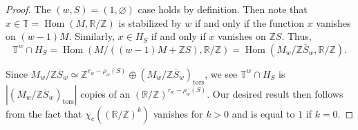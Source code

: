 \documentclass[12pt,a4paper]{amsart}
\theoremstyle{definition}
\newcommand{\TT}{\mathbb T}
\newcommand{\ZZ}{\mathbb{Z}}
\newcommand{\RR}{\mathbb{R}}
\renewcommand{\1}{\textbf{1}}
\newcommand{\<}{\langle}
\renewcommand{\>}{\rangle}
\DeclareMathOperator{\Hom}{Hom}
\DeclareMathOperator{\tors}{tors}
\begin{document}
\begin{proof}
The $(w,S)=(1,\varnothing)$ case holds by definition. Then note that $x\in\TT=\Hom(M,\RR/\ZZ)$ is stabilized by $w$ if and only if the function $x$ vanishes on $(w-1)M$. Similarly, $x\in H_S$ if and only if $x$ vanishes on $\ZZ S$. Thus, 
\[
	\TT^w\cap H_S=\Hom(M/((w-1)M+\ZZ S),\RR/\ZZ)=\Hom(M_w/\ZZ\overline{S}_w,\RR/\ZZ).
\]

%
%

Since $M_w/\ZZ\overline{S}_w\simeq\ZZ^{r_w-\rho_w(S)}\oplus(M_w/\ZZ\overline{S}_w)_{\tors}$, we see $\TT^w\cap H_S$ is $|(M_w/\ZZ\overline{S}_w)_{\tors}|$ copies of an $(\RR/\ZZ)^{r_w-\rho_w(S)}$. Our desired result then follows from the fact that $\chi_c((\RR/\ZZ)^k)$ vanishes for $k>0$ and is equal to $1$ if $k=0$.
\end{proof}
\end{document}
